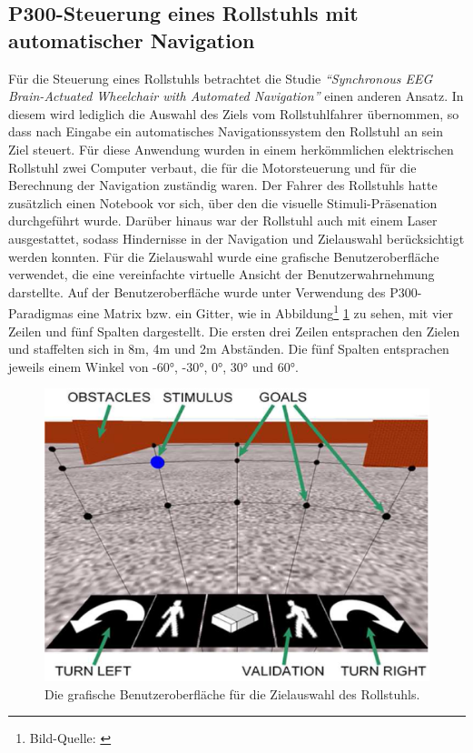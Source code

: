 \pagebreak
\subsection{P300-Steuerung eines Rollstuhls mit automatischer Navigation}
\vspace{0.3cm}

Für die Steuerung eines Rollstuhls betrachtet die Studie \textit{"`Synchronous EEG Brain-Actuated Wheelchair with Automated Navigation"'} \cite{WheelchairBCI1} einen anderen Ansatz.
In diesem wird lediglich die Auswahl des Ziels vom Rollstuhlfahrer übernommen, so dass nach Eingabe ein automatisches Navigationssystem den Rollstuhl an sein Ziel steuert.
Für diese Anwendung wurden in einem herkömmlichen elektrischen Rollstuhl zwei Computer verbaut, die für die Motorsteuerung und für die Berechnung der Navigation zuständig waren.
Der Fahrer des Rollstuhls hatte zusätzlich einen Notebook vor sich, über den die visuelle Stimuli-Präsenation durchgeführt wurde. 
Darüber hinaus war der Rollstuhl auch mit einem Laser ausgestattet, sodass Hindernisse in der Navigation und Zielauswahl berücksichtigt werden konnten.
Für die Zielauswahl wurde eine grafische Benutzeroberfläche verwendet, die eine vereinfachte virtuelle Ansicht der Benutzerwahrnehmung darstellte.
Auf der Benutzeroberfläche wurde unter Verwendung des P300-Paradigmas eine Matrix bzw. ein Gitter, wie in Abbildung\footnote[1]{Bild-Quelle: \cite[S.2]{WheelchairBCI1}} \ref{WheelchairGUI} zu sehen, mit vier Zeilen und fünf Spalten dargestellt. 
Die ersten drei Zeilen entsprachen den Zielen und staffelten sich in 8m, 4m und 2m Abständen.
Die fünf Spalten entsprachen jeweils einem Winkel von -60°, -30°, 0°, 30° und 60°.\\

\begin{figure}[h!]
\begin{center}
\includegraphics[scale=0.32]{images/WheelchairGUI.png}
\caption{Die grafische Benutzeroberfläche für die Zielauswahl des Rollstuhls.}
\label{WheelchairGUI}
\end{center}
\end{figure}

